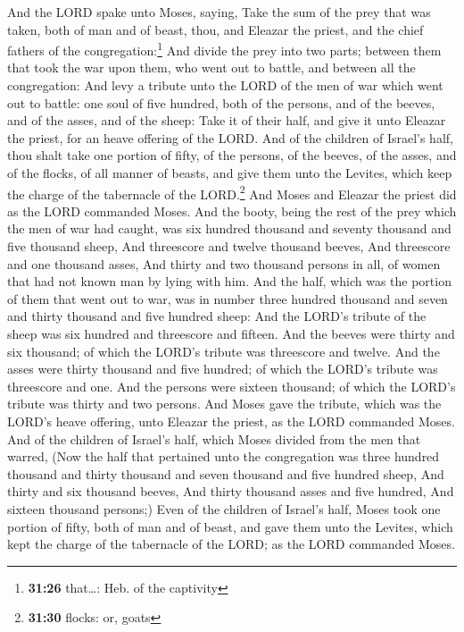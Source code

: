  And the LORD spake unto Moses, saying, 
Take the sum of the prey that was taken, both of man and of beast, thou,
and Eleazar the priest, and the chief fathers of the
congregation:\footnote{\textbf{31:26} that\ldots: Heb. of the captivity}
 And divide the prey into two parts; between them that
took the war upon them, who went out to battle, and between all the
congregation:  And levy a tribute unto the LORD of the
men of war which went out to battle: one soul of five hundred, both of
the persons, and of the beeves, and of the asses, and of the sheep:
 Take it of their half, and give it unto Eleazar the
priest, for an heave offering of the LORD.  And of the
children of Israel's half, thou shalt take one portion of fifty, of the
persons, of the beeves, of the asses, and of the flocks, of all manner
of beasts, and give them unto the Levites, which keep the charge of the
tabernacle of the LORD.\footnote{\textbf{31:30} flocks: or, goats}
 And Moses and Eleazar the priest did as the LORD
commanded Moses.  And the booty, being the rest of the
prey which the men of war had caught, was six hundred thousand and
seventy thousand and five thousand sheep,  And threescore
and twelve thousand beeves,  And threescore and one
thousand asses,  And thirty and two thousand persons in
all, of women that had not known man by lying with him. 
And the half, which was the portion of them that went out to war, was in
number three hundred thousand and seven and thirty thousand and five
hundred sheep:  And the LORD's tribute of the sheep was
six hundred and threescore and fifteen.  And the beeves
were thirty and six thousand; of which the LORD's tribute was threescore
and twelve.  And the asses were thirty thousand and five
hundred; of which the LORD's tribute was threescore and one.
 And the persons were sixteen thousand; of which the
LORD's tribute was thirty and two persons.  And Moses
gave the tribute, which was the LORD's heave offering, unto Eleazar the
priest, as the LORD commanded Moses.  And of the children
of Israel's half, which Moses divided from the men that warred,
 (Now the half that pertained unto the congregation was
three hundred thousand and thirty thousand and seven thousand and five
hundred sheep,  And thirty and six thousand beeves,
 And thirty thousand asses and five hundred,
 And sixteen thousand persons;)  Even of
the children of Israel's half, Moses took one portion of fifty, both of
man and of beast, and gave them unto the Levites, which kept the charge
of the tabernacle of the LORD; as the LORD commanded Moses.

